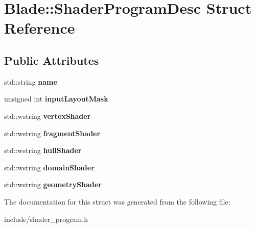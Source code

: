 \hypertarget{struct_blade_1_1_shader_program_desc}{}\section{Blade\+:\+:Shader\+Program\+Desc Struct Reference}
\label{struct_blade_1_1_shader_program_desc}
\subsection*{Public Attributes}
\begin{DoxyCompactItemize}
\item 
\mbox{\label{struct_blade_1_1_shader_program_desc_a45ca89cb30d1fa353fd31da28239ec9b}} 
std\+::string {\bfseries name}
\item 
\mbox{\label{struct_blade_1_1_shader_program_desc_adab308bc4740327603d25d5e37e8b9fc}} 
unsigned int {\bfseries input\+Layout\+Mask}
\item 
\mbox{\label{struct_blade_1_1_shader_program_desc_aeb9a39fcdf32e7d6fc5a4d4ad8b78cab}} 
std\+::wstring {\bfseries vertex\+Shader}
\item 
\mbox{\label{struct_blade_1_1_shader_program_desc_a80ec11b4720427f20c426bd4c9c6d0b0}} 
std\+::wstring {\bfseries fragment\+Shader}
\item 
\mbox{\label{struct_blade_1_1_shader_program_desc_a05b02c94d7d67dd35b889f6deb7a2d48}} 
std\+::wstring {\bfseries hull\+Shader}
\item 
\mbox{\label{struct_blade_1_1_shader_program_desc_a60c1aff8d3a268bd11f747949e0d1442}} 
std\+::wstring {\bfseries domain\+Shader}
\item 
\mbox{\label{struct_blade_1_1_shader_program_desc_a47e2c4cf3ac1bee75167b3e4b9758b06}} 
std\+::wstring {\bfseries geometry\+Shader}
\end{DoxyCompactItemize}


The documentation for this struct was generated from the following file\+:\begin{DoxyCompactItemize}
\item 
include/shader\+\_\+program.\+h\end{DoxyCompactItemize}
